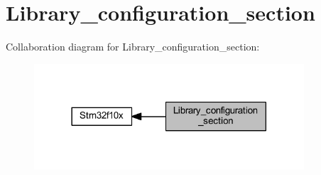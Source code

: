 \hypertarget{group___library__configuration__section}{}\section{Library\+\_\+configuration\+\_\+section}
\label{group___library__configuration__section}
Collaboration diagram for Library\+\_\+configuration\+\_\+section\+:
\nopagebreak
\begin{figure}[H]
\begin{center}
\leavevmode
\includegraphics[width=285pt]{group___library__configuration__section}
\end{center}
\end{figure}
